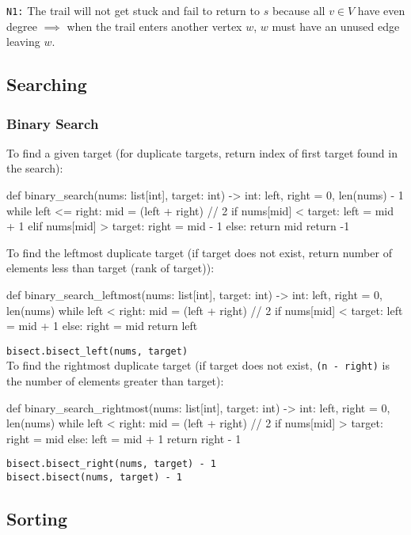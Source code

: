 \documentclass[12pt, titlepage]{article}
\begin{document}
\texttt{N1:} The trail will not get stuck and fail to return to $s$ because all $v \in V$ have even degree $\implies$ when the trail enters another vertex $w$, $w$ must have an unused edge leaving $w$.

\subsection{Searching}

\subsubsection{Binary Search}
To find a given target (for duplicate targets, return index of first target found in the search):
\begin{python}
def binary_search(nums: list[int], target: int) -> int:
    left, right = 0, len(nums) - 1
    while left <= right:
        mid = (left + right) // 2
        if nums[mid] < target:
            left = mid + 1
        elif nums[mid] > target:
            right = mid - 1
        else:
            return mid
    return -1
\end{python}
\bigskip

To find the leftmost duplicate target (if target does not exist, return number of elements less than target (rank of target)):
\begin{python}
def binary_search_leftmost(nums: list[int], target: int) -> int:
    left, right = 0, len(nums)
    while left < right:
        mid = (left + right) // 2
        if nums[mid] < target:
            left = mid + 1
        else:
            right = mid
    return left
\end{python}
\texttt{bisect.bisect\_left(nums, target)} \\

To find the rightmost duplicate target (if target does not exist, \texttt{(n - right)} is the number of elements greater than target):
\begin{python}
def binary_search_rightmost(nums: list[int], target: int) -> int:
    left, right = 0, len(nums)
    while left < right:
        mid = (left + right) // 2
        if nums[mid] > target:
            right = mid
        else:
            left = mid + 1
    return right - 1
\end{python}
\texttt{bisect.bisect\_right(nums, target) - 1} \\
\texttt{bisect.bisect(nums, target) - 1}

\subsection{Sorting}
\end{document}
